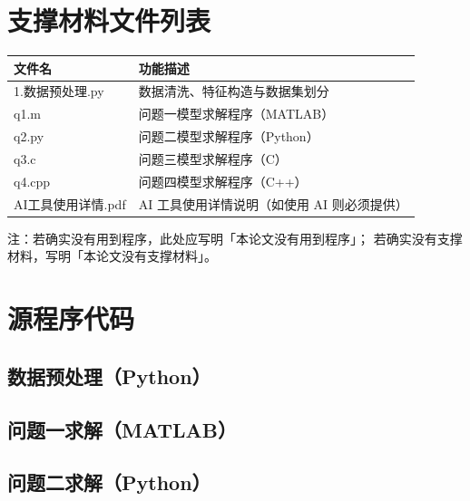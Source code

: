 \documentclass[withoutpreface,bwprint]{cumcmthesis}
\begin{document}
\newpage
\begin{appendices}

\section{支撑材料文件列表}

\begin{table}[H]
    \centering
    \begin{tabularx}{\textwidth}{LL}
        \toprule
        文件名 & 功能描述 \\
        \midrule
        1.数据预处理.py        & 数据清洗、特征构造与数据集划分 \\
        q1.m                   & 问题一模型求解程序（MATLAB） \\
        q2.py                  & 问题二模型求解程序（Python） \\
        q3.c                   & 问题三模型求解程序（C） \\
        q4.cpp                 & 问题四模型求解程序（C++） \\
        AI工具使用详情.pdf      & AI 工具使用详情说明（如使用 AI 则必须提供） \\
        \bottomrule
    \end{tabularx}
    \label{tab:filelist}
\end{table}

注：若确实没有用到程序，此处应写明「本论文没有用到程序」；
若确实没有支撑材料，写明「本论文没有支撑材料」。

\newpage
\section{源程序代码}

\subsection{数据预处理（Python）}


\subsection{问题一求解（MATLAB）}
%

\subsection{问题二求解（Python）}
%


\end{appendices}
\end{document}
